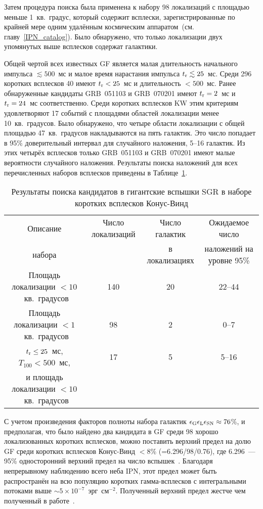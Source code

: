 Затем процедура поиска была применена к набору 98 локализаций с площадью меньше 
1~кв.~градус, который содержит всплески, зарегистрированные по крайней мере одним 
удалённым космическим аппаратом~(см. главу~\ref{IPN_catalog}). Было обнаружено, 
что только локализации двух упомянутых выше всплесков содержат галактики.

Общей чертой всех известных GF является малая длительность начального импульса 
$\lesssim 500$~мс и малое время нарастания импульса $t_{{\mathrm{r}}} \lesssim 25$~мс. 
Среди 296 коротких всплесков 40 имеют $t_{{\mathrm{r}}}<25$~мс и длительность $<500$~мс. 
Ранее обнаруженные кандидаты GRB~051103 и GRB~070201 имеют $t_{{\mathrm{r}}}=2$~мс 
и~$t_{{\mathrm{r}}}=24$~мс соответственно. Среди коротких всплесков KW этим 
критериям удовлетворяют 17 событий с площадями областей локализации менее 10~кв.~градусов.
Было обнаружено, что четыре области локализации с общей площадью 47~кв.~градусов накладываются на пять галактик. 
Это число попадает в 95\% доверительный интервал для случайного наложения, 5--16 галактик. Из этих 
четырёх всплесков только GRB~051103 и GRB~070201 имеют малые вероятности случайного наложения.
Результаты поиска наложений для всех перечисленных наборов всплесков приведены 
в Таблице~\ref{tab:SearchResults}.

\begin{table}[h]
  \centering
  \scriptsize
  \caption{Результаты поиска кандидатов в гигантские вспышки SGR в 
  наборе коротких всплесков Конус-Винд}
  \label{tab:SearchResults}
  \begin{tabular}{cccc}
  \hline
  \hline
Описание & Число локализаций  & Число галактик & Ожидаемое число  \\
набора   &                    & в локализациях & наложений на уровне 95\% \\
\hline
Площадь локализации $<10$~кв.~градусов  & 140 & 20 & 22--44 \\
Площадь локализации $<1$~кв.~градусов   & 98 & 2 & 0--7\\
$t_{{\mathrm{r}}} \leq 25$~мс, $T_{100}<500$~мс, & 17 & 5 & 5--16\\
и площадь локализации $<10$~кв.~градусов & & & \\
\hline
\end{tabular}
\end{table}

С учетом произведения факторов полноты набора галактик $\epsilon_{{\mathrm{G}}} \epsilon_{{\mathrm{L}}} \epsilon_{{\mathrm{SN}}} \approx 76$\%, 
и предполагая, что было найдено два кандидата в GF среди 98 хорошо локализованных коротких всплесков, 
можно поставить верхний предел на долю GF среди коротких всплесков Конус-Винд 
$<8$\% (=6.296/98/0.76), где 6.296~--- 95\% односторонний верхний предел на 
число вспышек~\citep{Gehrels1986}. Благодаря непрерывному наблюдению всего неба IPN, 
этот предел может быть распространён на всю популяцию коротких гамма-всплесков с 
интегральными потоками выше $\sim 5\times 10^{-7}$~эрг~см$^{-2}$. Полученный верхний 
предел жестче чем полученный в работе~\citep{Ofek_2007ApJ}.

